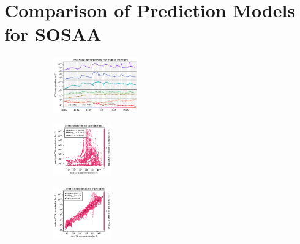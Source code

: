 \section{Comparison of Prediction Models for SOSAA} \label{txt:model-evaluation}

\begin{figure}[H]
    \begin{subfigure}
    \centering
    \includegraphics[width=0.4\textwidth]{prediction/figures/models/linearmodel-training-prediction.pdf}
    \end{subfigure}
    \begin{subfigure}
    \centering
    \includegraphics[width=0.275\textwidth]{prediction/figures/models/linearmodel-test-generalisation.pdf}
    \end{subfigure}
    \begin{subfigure}
    \centering
    \includegraphics[width=0.275\textwidth]{prediction/figures/models/linearmodel-test-prediction.pdf}
    \end{subfigure}
   

\end{figure}
